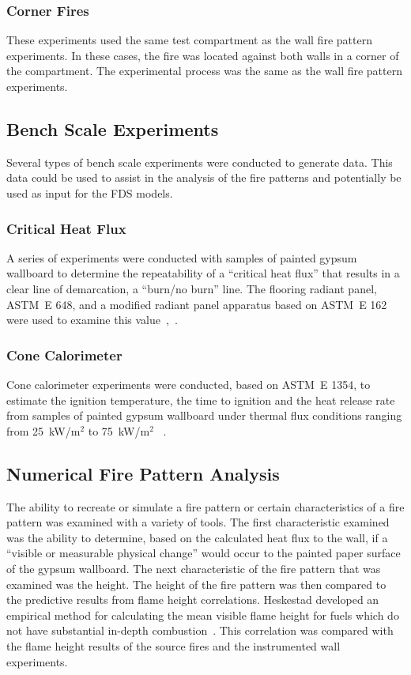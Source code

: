 \documentclass[twoside]{uocthesis}
\begin{document}
{\subsubsection{Corner Fires}

These experiments used the same test compartment as the wall fire pattern experiments.  In these cases, the fire was located against both walls in a corner of the compartment.  The experimental process was the same as the wall fire pattern experiments.

\subsection{Bench Scale Experiments}

Several types of bench scale experiments were conducted to generate data. This data could be used to assist in the analysis of the fire patterns and potentially be used as input for the FDS models.

\subsubsection{Critical Heat Flux}

A series of experiments were conducted with samples of painted gypsum wallboard to determine the repeatability of a ``critical heat flux'' that results in a clear line of demarcation, a ``burn/no burn'' line.  The flooring radiant panel, ASTM~E 648, and a modified radiant panel apparatus based on ASTM~E 162 were used to examine this value~\cite{ASTM_E648},~\cite{ASTM_E162}.

\subsubsection{Cone Calorimeter}

Cone calorimeter experiments were conducted, based on ASTM~E 1354, to estimate the ignition temperature, the time to ignition and the heat release rate from samples of painted gypsum wallboard under thermal flux conditions ranging from 25~kW/m$^2$ to 75~kW/m$^2$ ~\cite{ASTM_E1354}.

\subsection{Numerical Fire Pattern Analysis}

The ability to recreate or simulate a fire pattern or certain characteristics of a fire pattern was examined with a variety of tools.  The first characteristic examined was the ability to determine, based on the calculated heat flux to the wall, if a ``visible or measurable physical change'' would occur to the painted paper surface of the gypsum wallboard.  The next characteristic of the fire pattern that was examined was the height.  The height of the fire pattern was then compared to the predictive results from flame height correlations. Heskestad developed an empirical method for calculating the mean visible flame height for fuels which do not have substantial in-depth combustion~\cite{Beyler:1986,Heskestad:SFPE}. This correlation was compared with the flame height results of the source fires and the instrumented wall experiments.

}
\end{document}
